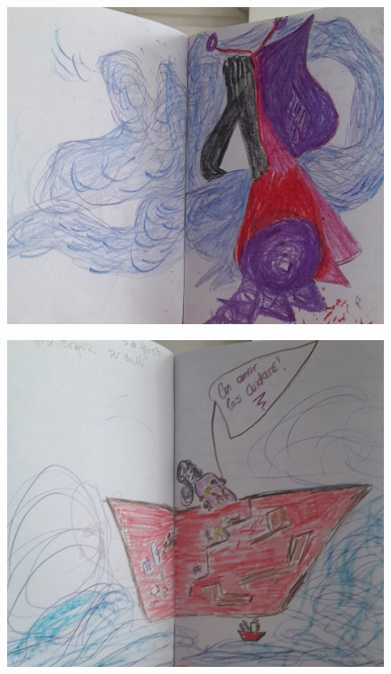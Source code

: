 \documentclass[12pt, a4paper, twoside]{book} %
\begin{document}
\begin{figure}[H]
	\centering
	\includegraphics[width=\textwidth]{./images/1f81324df258a4.jpg}
\end{figure}

\begin{figure}[H]
	\centering
	\includegraphics[width=\textwidth]{./images/1f81324df3b99e.jpg}
\end{figure}
\end{document}
